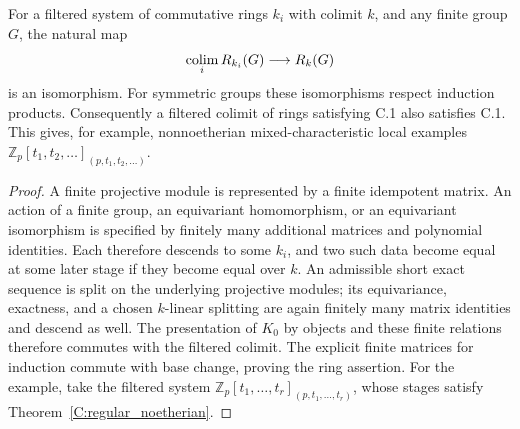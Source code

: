 \begin{proposition}
\label{C:filtered_colimits}
For a filtered system of commutative rings $k_i$ with colimit $k$, and
any finite group $G$, the natural map
\[
 \mathop{\rm colim}_i R_{k_i}(G)\longrightarrow R_k(G)
\]
is an isomorphism. For symmetric groups these isomorphisms respect induction
products. Consequently a filtered colimit of rings satisfying C.1 also
satisfies C.1. This gives, for example, nonnoetherian mixed-characteristic
local examples
$\mathbb Z_p[t_1,t_2,\ldots]_{(p,t_1,t_2,\ldots)}$.
\end{proposition}
\begin{proof}
A finite projective module is represented by a finite idempotent matrix.
An action of a finite group, an equivariant homomorphism, or an equivariant
isomorphism is specified by finitely many additional matrices and polynomial
identities. Each therefore descends to some $k_i$, and two such data become
equal at some later stage if they become equal over $k$.
An admissible short exact sequence is split on the underlying projective
modules; its equivariance, exactness, and a chosen $k$-linear splitting are
again finitely many matrix identities and descend as well. The presentation
of $K_0$ by objects and these finite relations therefore commutes with the
filtered colimit. The explicit finite matrices for induction commute with
base change, proving the ring assertion. For the example, take the filtered
system $\mathbb Z_p[t_1,\ldots,t_r]_{(p,t_1,\ldots,t_r)}$, whose stages
satisfy Theorem~\ref{C:regular_noetherian}.
\end{proof}

